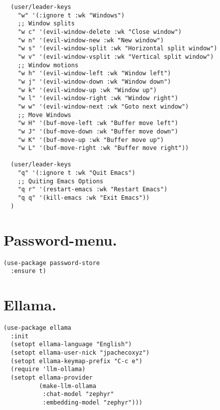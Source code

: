\documentclass[11pt]{article}
\begin{document}
\begin{verbatim}
  (user/leader-keys
    "w" '(:ignore t :wk "Windows")
    ;; Window splits
    "w c" '(evil-window-delete :wk "Close window")
    "w n" '(evil-window-new :wk "New window")
    "w s" '(evil-window-split :wk "Horizontal split window")
    "w v" '(evil-window-vsplit :wk "Vertical split window")
    ;; Window motions
    "w h" '(evil-window-left :wk "Window left")
    "w j" '(evil-window-down :wk "Window down")
    "w k" '(evil-window-up :wk "Window up")
    "w l" '(evil-window-right :wk "Window right")
    "w w" '(evil-window-next :wk "Goto next window")
    ;; Move Windows
    "w H" '(buf-move-left :wk "Buffer move left")
    "w J" '(buf-move-down :wk "Buffer move down")
    "w K" '(buf-move-up :wk "Buffer move up")
    "w L" '(buf-move-right :wk "Buffer move right"))

  (user/leader-keys
    "q" '(:ignore t :wk "Quit Emacs")
    ;; Quiting Emacs Options
    "q r" '(restart-emacs :wk "Restart Emacs")
    "q q" '(kill-emacs :wk "Exit Emacs"))
  )
\end{verbatim}
\section{Password-menu.}
\label{sec:orge497e34}
\begin{verbatim}
(use-package password-store
  :ensure t)
\end{verbatim}
\section{Ellama.}
\label{sec:org61c0ac0}
\begin{verbatim}
(use-package ellama
  :init
  (setopt ellama-language "English")
  (setopt ellama-user-nick "jpachecoxyz")
  (setopt ellama-keymap-prefix "C-c e")
  (require 'llm-ollama)
  (setopt ellama-provider
          (make-llm-ollama
           :chat-model "zephyr"
           :embedding-model "zephyr")))
\end{verbatim}
\end{document}

